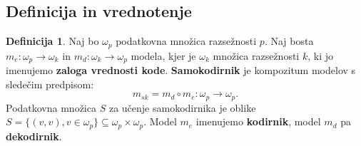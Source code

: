 \documentclass[12pt,a4paper,twoside]{article}
\theoremstyle{definition} %
\newtheorem{definicija}{Definicija}[section]
\theoremstyle{plain} %
\numberwithin{equation}{section}  %
\begin{document}



\subsection{Definicija in vrednotenje}

\begin{definicija}
\label{def-samokodirnik}
Naj bo $\omega_p$ podatkovna množica razsežnosti $p$. 
Naj bosta $m_e: \omega_p \rightarrow \omega_k$ in $m_d: \omega_k \rightarrow \omega_p$ modela, kjer je $\omega_k$ množica razsežnosti $k$, ki jo imenujemo \textbf{zaloga vrednosti kode}. \textbf{Samokodirnik} je kompozitum modelov s sledečim predpisom:
\[
m_{s k} = m_d \circ m_e : \omega_p \rightarrow \omega_p .
\]
Podatkovna množica $S$ za učenje samokodirnika je oblike $S = \{(v, v), v \in \omega_p\} \subseteq \omega_p \times \omega_p$. Model $m_e$ imenujemo \textbf{kodirnik}, model $m_d$ pa \textbf{dekodirnik}.
\end{definicija}
\end{document}
